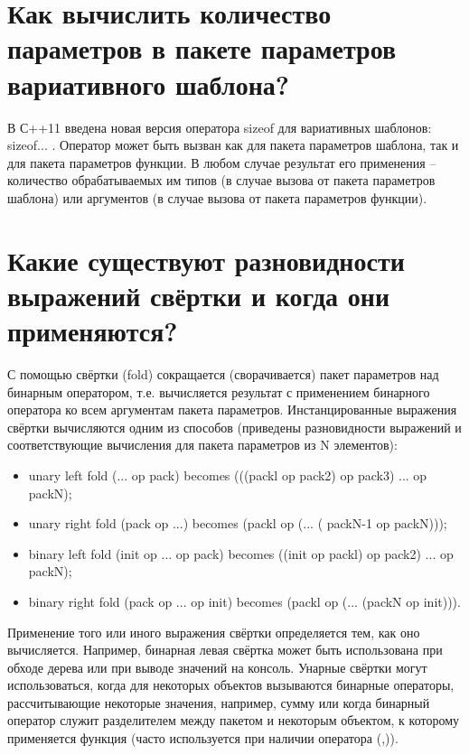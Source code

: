 \documentclass[a4paper,12pt]{article}	%
\begin{document}
\newpage

\section{Как вычислить количество параметров в пакете параметров вариативного шаблона?}
	
	В С++11 введена новая версия оператора sizeof для вариативных шаблонов: sizeof... . Оператор может быть вызван как для пакета параметров шаблона, так и для пакета параметров функции. В любом случае результат его применения -- количество обрабатываемых им типов (в случае вызова от пакета параметров шаблона) или аргументов (в случае вызова от пакета параметров функции).		
	
\newpage

\section{Какие существуют разновидности выражений свёртки и когда они применяются?}

	С помощью свёртки (fold) сокращается (сворачивается) пакет параметров над бинарным оператором, т.е. вычисляется результат с применением бинарного оператора ко всем аргументам пакета параметров. Инстанцированные выражения свёртки вычисляются одним из способов (приведены разновидности выражений и соответствующие вычисления для пакета параметров из N элементов):
	
	\begin{itemize}

		\item unary left fold (... op pack) becomes (((packl op pack2) op pack3) ... op packN);
	
		\item unary right fold (pack op ...) becomes (packl op (... ( packN-1 op packN)));
	
		\item binary left fold (init op ... op pack) becomes ((init op packl) op pack2) ... op packN);
	
		\item binary right fold (pack op ... op init) becomes (packl op (... (packN op init))).
	
	\end{itemize}
	
	Применение того или иного выражения свёртки определяется тем, как оно вычисляется. Например, бинарная левая свёртка может быть использована при обходе дерева или при выводе значений на консоль. Унарные свёртки могут использоваться, когда для некоторых объектов вызываются бинарные операторы, рассчитывающие некоторые значения, например, сумму или когда бинарный оператор служит разделителем между пакетом и некоторым объектом, к которому применяется функция (часто используется при наличии оператора (,)).
\end{document}

